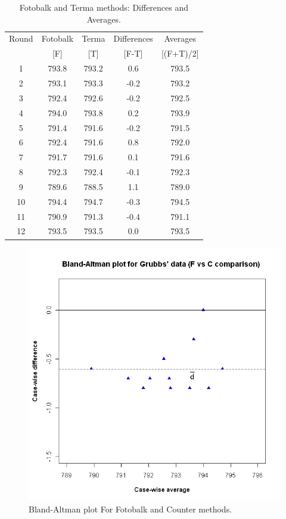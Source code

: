 \documentclass[12pt, a4paper]{report}
\theoremstyle{plain}
\theoremstyle{definition}
\theoremstyle{remark}
\begin{document}
	\begin{table}[h!]
		\renewcommand\arraystretch{0.7}%
		\begin{center}
			\begin{tabular}{|c||c|c||c|c|}
				\hline
				Round & Fotobalk  & Terma  & Differences  & Averages  \\
				&  [F] & [T] & [F-T] &  [(F+T)/2] \\
				\hline
				1 & 793.8 & 793.2 & 0.6 & 793.5 \\
				2 & 793.1 & 793.3 & -0.2 & 793.2 \\
				3 & 792.4 & 792.6 & -0.2 & 792.5 \\
				4 & 794.0 & 793.8 & 0.2 & 793.9 \\
				5 & 791.4 & 791.6 & -0.2 & 791.5 \\
				6 & 792.4& 791.6 & 0.8 & 792.0 \\
				7 & 791.7 & 791.6 & 0.1 & 791.6 \\
				8 & 792.3 & 792.4 & -0.1 & 792.3 \\
				9 & 789.6 & 788.5 & 1.1 & 789.0 \\
				10 & 794.4 & 794.7 & -0.3 & 794.5 \\
				11 & 790.9 & 791.3 & -0.4 & 791.1 \\
				12 & 793.5 & 793.5 & 0.0 & 793.5 \\
				
				\hline
			\end{tabular}
			\caption{Fotobalk and Terma methods: Differences and Averages.}
		\end{center}
	\end{table}
	
	\newpage
	
	\begin{figure}[h!]
		\begin{center}
			\includegraphics[width=120mm]{images/GrubbsBAplot-noLOA.jpeg}
			\caption{Bland-Altman plot For Fotobalk and Counter methods.}\label{GrubbsBA-noLOA}
		\end{center}
	\end{figure}
	
\end{document}
